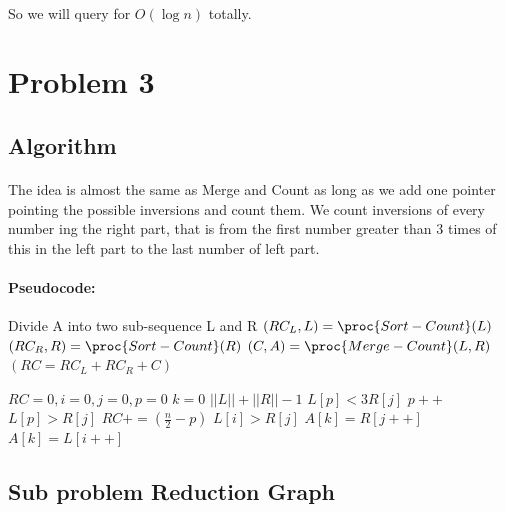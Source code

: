 \documentclass[]{article}
\begin{document}
            \paragraph{} So we will query for $O(\log n)$ totally.
    
    
    
    \section{Problem 3}
        \subsection{Algorithm}
            \paragraph{} The idea is almost the same as Merge and Count as long as we add one pointer pointing the possible inversions and count them. We count inversions of every number ing the right part, that  is from the first number greater than 3 times of this in the left part to the last number of left part.
            \paragraph{Pseudocode:}
\begin{codebox}
\li    Divide A into two sub-sequence L and R
\li    $(RC_L,L) = \proc{Sort-Count}(L)$
\li    $(RC_R,R) = \proc{Sort-Count}(R)$
\li    $(C,A) = \proc{Merge-Count}(L,R)$
\li    \Return $(RC=RC_L+RC_R+C)$
\End

\end{codebox}
\begin{codebox}
\li    $RC=0,i=0,j=0,p=0$
\li    \For $k=0$ \To $||L||+||R||-1$ 
\li        \Do                         \label{li:p_start}
\li            \While $L[p] < 3R[j]$
\li                \Do $p++$
               \End                    \label{li:p_end}
\li            \If $L[p] > R[j]$
\li                \Then $RC += (\frac{n}{2}-p)$ \label{li:count}
               \End
\li            \If $L[i] > R[j]$
\li                \Then $A[k] = R[j++]$
\li            \Else 
\li                $A[k] = L[i++]$
               \End
       \End
\end{codebox}
        \subsection{Sub problem Reduction Graph}
\end{document}
